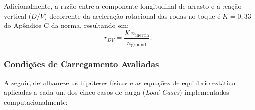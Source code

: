 Adicionalmente, a razão entre a componente longitudinal de arrasto e a reação vertical ($D/V$) decorrente da aceleração rotacional das rodas no toque é $K = 0,33$ do Apêndice C da norma, resultando em:
\begin{equation}
    r_{DV} = \frac{K \, n_{\text{inertia}}}{n_{\text{ground}}}.
    \label{eq:r_dv}
\end{equation}

\subsubsection*{Condições de Carregamento Avaliadas}

A seguir, detalham-se as hipóteses físicas e as equações de equilíbrio estático aplicadas a cada um dos cinco casos de carga (\textit{Load Cases}) implementados computacionalmente:

